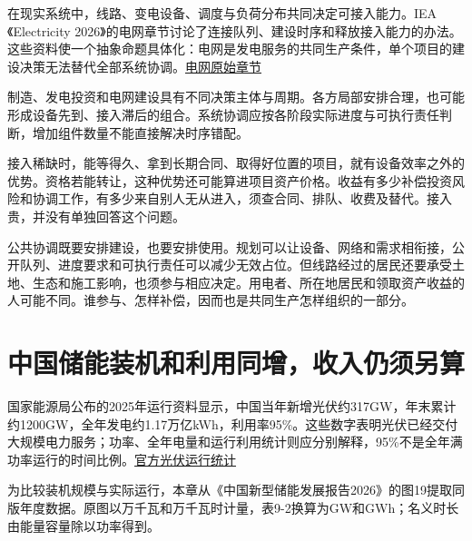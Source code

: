 \documentclass[UTF8,fontset=windows,12pt,a4paper,oneside,openany]{ctexbook}
\begin{document}
在现实系统中，线路、变电设备、调度与负荷分布共同决定可接入能力。IEA《Electricity 2026》的电网章节讨论了连接队列、建设时序和释放接入能力的办法。这些资料使一个抽象命题具体化：电网是发电服务的共同生产条件，单个项目的建设决策无法替代全部系统协调。\href{https://www.iea.org/reports/electricity-2026/grids}{电网原始章节}

制造、发电投资和电网建设具有不同决策主体与周期。各方局部安排合理，也可能形成设备先到、接入滞后的组合。系统协调应按各阶段实际进度与可执行责任判断，增加组件数量不能直接解决时序错配。

接入稀缺时，能等得久、拿到长期合同、取得好位置的项目，就有设备效率之外的优势。资格若能转让，这种优势还可能算进项目资产价格。收益有多少补偿投资风险和协调工作，有多少来自别人无从进入，须查合同、排队、收费及替代。接入贵，并没有单独回答这个问题。

公共协调既要安排建设，也要安排使用。规划可以让设备、网络和需求相衔接，公开队列、进度要求和可执行责任可以减少无效占位。但线路经过的居民还要承受土地、生态和施工影响，也须参与相应决定。用电者、所在地居民和领取资产收益的人可能不同。谁参与、怎样补偿，因而也是共同生产怎样组织的一部分。

\section{中国储能装机和利用同增，收入仍须另算}

国家能源局公布的2025年运行资料显示，中国当年新增光伏约317GW，年末累计约1200GW，全年发电约1.17万亿kWh，利用率95\%。这些数字表明光伏已经交付大规模电力服务；功率、全年电量和运行利用统计则应分别解释，95\%不是全年满功率运行的时间比例。\href{https://www.nea.gov.cn/20260212/742b8c6a078347b0b39de676c05c5d58/c.html}{官方光伏运行统计}

为比较装机规模与实际运行，本章从《中国新型储能发展报告2026》的图19提取同版年度数据。原图以万千瓦和万千瓦时计量，表9-2换算为GW和GWh；名义时长由能量容量除以功率得到。
\end{document}
